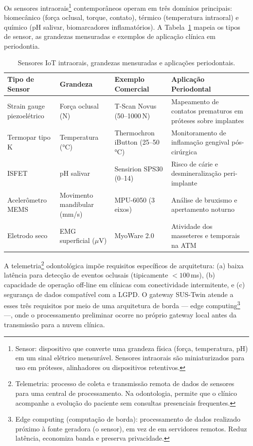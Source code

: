 Os sensores intraorais\footnote{Sensor: dispositivo que converte uma grandeza física (força, temperatura, pH) em um sinal elétrico mensurável. Sensores intraorais são miniaturizados para uso em próteses, alinhadores ou dispositivos retentivos.} contemporâneos operam em três domínios principais: biomecânico (força oclusal, torque, contato), térmico (temperatura intraoral) e químico (pH salivar, biomarcadores inflamatórios). A Tabela~\ref{tab:sensores-grandezas} mapeia os tipos de sensor, as grandezas mensuradas e exemplos de aplicação clínica em periodontia.

\begin{table}[hbt!]
\centering
\caption{Sensores IoT intraorais, grandezas mensuradas e aplicações periodontais.}
\label{tab:sensores-grandezas}
\small
\begin{tabular}{lllp{5.5cm}}
\toprule
\textbf{Tipo de Sensor} & \textbf{Grandeza} & \textbf{Exemplo Comercial} & \textbf{Aplicação Periodontal} \\
\midrule
Strain gauge piezoelétrico & Força oclusal (N) & T-Scan Novus (50--1000\,N) & Mapeamento de contatos prematuros em próteses sobre implantes \\
\addlinespace
Termopar tipo K & Temperatura (°C) & Thermochron iButton (25--50\,°C) & Monitoramento de inflamação gengival pós-cirúrgica \\
\addlinespace
ISFET & pH salivar & Sensirion SPS30 (0--14) & Risco de cárie e desmineralização peri-implante \\
\addlinespace
Acelerômetro MEMS & Movimento mandibular (mm/s) & MPU-6050 (3 eixos) & Análise de bruxismo e apertamento noturno \\
\addlinespace
Eletrodo seco & EMG superficial ($\mu$V) & MyoWare 2.0 & Atividade dos masseteres e temporais na ATM \\
\bottomrule
\end{tabular}
\end{table}

A telemetria\footnote{Telemetria: processo de coleta e transmissão remota de dados de sensores para uma central de processamento. Na odontologia, permite que o clínico acompanhe a evolução do paciente sem consultas presenciais frequentes.} odontológica impõe requisitos específicos de arquitetura: (a) baixa latência para detecção de eventos oclusais (tipicamente $<100$\,ms), (b) capacidade de operação off-line em clínicas com conectividade intermitente, e (c) segurança de dados compatível com a LGPD. O gateway SUS-Twin atende a esses três requisitos por meio de uma arquitetura de borda --- edge computing\footnote{Edge computing (computação de borda): processamento de dados realizado próximo à fonte geradora (o sensor), em vez de em servidores remotos. Reduz latência, economiza banda e preserva privacidade.} ---, onde o processamento preliminar ocorre no próprio gateway local antes da transmissão para a nuvem clínica.

